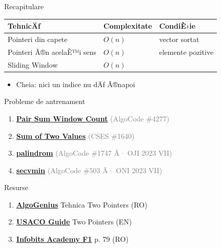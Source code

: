 ﻿\documentclass{beamer}
\begin{document}
\begin{frame}{Recapitulare}
  \begin{center}
  \begin{tabular}{lll}
    \toprule
    TehnicÄƒ & Complexitate & CondiÈ›ie \\
    \midrule
    Pointeri din capete      & $O(n)$ & vector sortat \\
    Pointeri Ã®n acelaÈ™i sens & $O(n)$ & elemente pozitive \\
    Sliding Window       & $O(n)$ & \textemdash{} \\
    \bottomrule
  \end{tabular}
  \end{center}

  \begin{itemize}
    \item Cheia: nici un indice nu dÄƒ Ã®napoi
  \end{itemize}
\end{frame}

\begin{frame}{Probleme de antrenament}
  \begin{enumerate}\footnotesize\itemsep2pt
    \item \href{https://code.algolymp.com/problems/4277}{\textbf{Pair Sum Window Count}}
          \textcolor{gray}{(AlgoCode \#4277)}
    \item \href{https://cses.fi/problemset/task/1640}{\textbf{Sum of Two Values}}
          \textcolor{gray}{(CSES \#1640)}
    \item \href{https://code.algolymp.com/problems/1747}{\textbf{palindrom}}
          \textcolor{gray}{(AlgoCode \#1747 Â· OJI 2023 VII)}
    \item \href{https://code.algolymp.com/problems/503}{\textbf{secvmin}}
          \textcolor{gray}{(AlgoCode \#503 Â· ONI 2023 VII)}
  \end{enumerate}
\end{frame}

\begin{frame}{Resurse}
  \begin{enumerate}\itemsep6pt
    \item \href{https://old.algogenius.ro/two-pointers/}{\textbf{AlgoGenius}}
          \textemdash{} Tehnica Two Pointers (RO)
    \item \href{https://usaco.guide/silver/two-pointers?lang=cpp}{\textbf{USACO Guide}}
          \textemdash{} Two Pointers (EN)
    \item \href{https://cdn.sepi.ro/infobits-f1.pdf}{\textbf{Infobits Academy F1}}
          \textemdash{} p. 79 (RO)
  \end{enumerate}
\end{frame}
\end{document}
